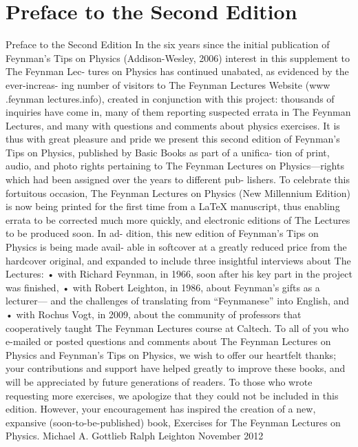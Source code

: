 \documentclass[10pt,oneside]{article}
\begin{document}
\section*{Preface to the Second Edition}
\label{tips-sec-1-preface-to-the-second-edition}
Preface to the Second Edition In the six years since the initial publication of Feynman’s Tips on Physics (Addison-Wesley, 2006) interest in this supplement to The Feynman Lec- tures on Physics has continued unabated, as evidenced by the ever-increas- ing number of visitors to The Feynman Lectures Website (www .feynman lectures.info), created in conjunction with this project: thousands of inquiries have come in, many of them reporting suspected errata in The Feynman Lectures, and many with questions and comments about physics exercises. It is thus with great pleasure and pride we present this second edition of Feynman’s Tips on Physics, published by Basic Books as part of a unifica- tion of print, audio, and photo rights pertaining to The Feynman Lectures on Physics---rights which had been assigned over the years to different pub- lishers. To celebrate this fortuitous occasion, The Feynman Lectures on Physics (New Millennium Edition) is now being printed for the first time from a LaTeX manuscript, thus enabling errata to be corrected much more quickly, and electronic editions of The Lectures to be produced soon. In ad- dition, this new edition of Feynman’s Tips on Physics is being made avail- able in softcover at a greatly reduced price from the hardcover original, and expanded to include three insightful interviews about The Lectures: • with Richard Feynman, in 1966, soon after his key part in the project was finished, • with Robert Leighton, in 1986, about Feynman’s gifts as a lecturer--- and the challenges of translating from “Feynmanese” into English, and • with Rochus Vogt, in 2009, about the community of professors that cooperatively taught The Feynman Lectures course at Caltech. To all of you who e-mailed or posted questions and comments about The Feynman Lectures on Physics and Feynman’s Tips on Physics, we wish to offer our heartfelt thanks; your contributions and support have helped greatly to improve these books, and will be appreciated by future generations of readers. To those who wrote requesting more exercises, we apologize that they could not be included in this edition. However, your encouragement has inspired the creation of a new, expansive (soon-to-be-published) book, Exercises for The Feynman Lectures on Physics. Michael A. Gottlieb Ralph Leighton November 2012\par
\end{document}
